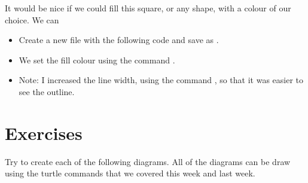 \documentclass{coderdojo}
\begin{document}
It would be nice if we could fill this square, or any shape, with a colour of our choice. We can 

\begin{itemize}
\item[\todoSymbol] \color{todo}
Create a new file with the following code and save as .
\end{itemize}



\begin{itemize}
\item We set the fill colour using the command .
\item Note: I increased the line width, using the command , so that it was easier to see the outline.
\end{itemize}

\clearpage

\section{Exercises}

Try to create each of the following diagrams. All of the diagrams can be draw using the turtle commands that we covered this week and last week.
\end{document}
